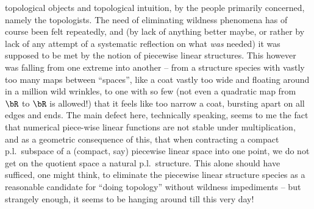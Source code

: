 topological objects and topological intuition, by the people
primarily concerned, namely the topologists. The need of eliminating
wildness phenomena has of course been felt repeatedly, and (by lack of
anything better maybe, or rather by lack of any attempt of a
systematic reflection on what \emph{was} needed) it was supposed to be
met by the notion of piecewise linear structures. This however was
falling from one extreme into another -- from a structure species with
vastly too many maps between ``spaces'', like a coat vastly too wide
and floating around in a million wild wrinkles, to one with so few
(not even a quadratic map from $\bR$ to $\bR$ is allowed!) that it
feels like too narrow a coat, bursting apart on all edges and
ends. The main defect here, technically speaking, seems to me the fact
that numerical piece-wise linear functions are not stable under
multiplication, and as a geometric consequence of this, that when
contracting a compact p.l.\ subspace of a (compact, say) piecewise
linear space into one point, we do not get on the quotient space a
natural p.l.\ structure. This alone should have sufficed, one might
think, to eliminate the piecewise linear structure species as a
reasonable candidate for ``doing topology'' without wildness
impediments -- but strangely enough, it seems to be hanging around
till this very day!

